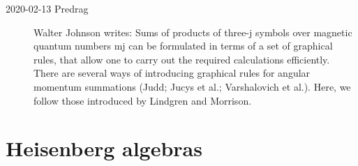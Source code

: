 \begin{description}
 \item[2020-02-13 Predrag]
  {Walter Johnson} writes:
Sums of products of three-j symbols over magnetic quantum numbers mj can
be formulated in terms of a set of graphical rules, that allow one to
carry out the required calculations efficiently. There are several ways
of introducing graphical rules for angular momentum summations
(Judd; Jucys et al.; Varshalovich et
al.). Here, we follow those introduced by Lindgren and
Morrison.




\end{description}

\section{Heisenberg algebras}
\label{s-Heisenberg}

